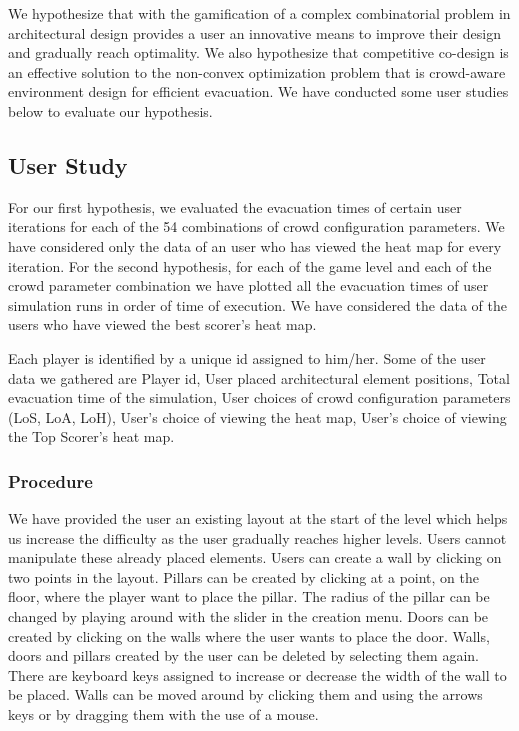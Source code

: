 We hypothesize that with the gamification of a complex combinatorial problem in architectural design provides a user an innovative means to improve their design and gradually reach optimality. We also hypothesize that competitive co-design is an effective solution to the non-convex optimization problem that is crowd-aware environment design for efficient evacuation. We have conducted some user studies below to evaluate our hypothesis.

\subsection{User Study}
For our first hypothesis, we evaluated the evacuation times of certain user iterations for each of the 54 combinations of crowd configuration parameters. We have considered only the data of an user who has viewed the heat map for every iteration. For the second hypothesis, for each of the game level and each of the crowd parameter combination we have plotted all the evacuation times of user simulation runs in order of time of execution. We have considered the data of the users who have viewed the best scorer's heat map. 

Each player is identified by a unique id assigned to him/her. Some of the user data we gathered are Player id, User placed architectural element positions, Total evacuation time of the simulation, User choices of crowd configuration parameters (LoS, LoA, LoH), User's choice of viewing the heat map, User's choice of viewing the Top Scorer's heat map. 

\subsubsection{Procedure}
We have provided the user an existing layout at the start of the level which helps us increase the difficulty as the user gradually reaches higher levels. Users cannot manipulate these already placed elements. Users can create a wall by clicking on two points in the layout. Pillars can be created by clicking at a point, on the floor, where the player want to place the pillar. The radius of the pillar can be changed by playing around with the slider in the creation menu. Doors can be created by clicking on the walls where the user wants to place the door. Walls, doors and pillars created by the user can be deleted by selecting them again. There are keyboard keys assigned to increase or decrease the width of the wall to be placed. Walls can be moved around by clicking them and using the arrows keys or by dragging them with the use of a mouse.

